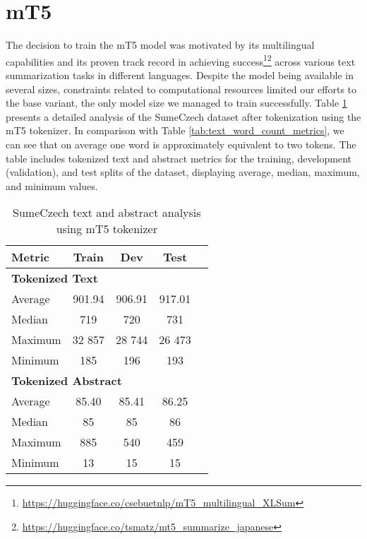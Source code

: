 \documentclass[english, ba, kiv, he, iso690numb, pdf, viewonly]{fasthesis}
\begin{document}
\section{mT5} \label{impl:mt5}
The decision to train the mT5 model was motivated by its multilingual capabilities and its proven track record in achieving success\footnote{\url{https://huggingface.co/csebuetnlp/mT5_multilingual_XLSum}}\footnote{\url{https://huggingface.co/tsmatz/mt5_summarize_japanese}} across various text summarization tasks in different languages. Despite the model being available in several sizes, constraints related to computational resources limited our efforts to the base variant, the only model size we managed to train successfully. Table \ref{tab:tokenized_text_abstract_metrics} presents a detailed analysis of the SumeCzech dataset after tokenization using the mT5 tokenizer. In comparison with Table \ref{tab:text_word_count_metrics}, we can see that on average one word is approximately equivalent to two tokens. The table includes tokenized text and abstract metrics for the training, development (validation), and test splits of the dataset, displaying average, median, maximum, and minimum values.

\begin{table}[htbp]
    \centering
    \caption{SumeCzech text and abstract analysis using mT5 tokenizer}
    \label{tab:tokenized_text_abstract_metrics}
    \begin{tabular}{lcccc}
        \toprule
        \textbf{Metric} & {\textbf{Train}} & {\textbf{Dev}} & {\textbf{Test}} \\
        \midrule
        \multicolumn{4}{l}{\textbf{Tokenized Text}} \\
        \midrule
        Average & 901.94 & 906.91 & 917.01 \\
        Median & 719 & 720 & 731 \\
        Maximum & 32 857 & 28 744 & 26 473 \\
        Minimum & 185 & 196 & 193 \\
        \midrule
        \multicolumn{4}{l}{\textbf{Tokenized Abstract}} \\
        \midrule
        Average & 85.40 & 85.41 & 86.25 \\
        Median & 85 & 85 & 86 \\
        Maximum & 885 & 540 & 459 \\
        Minimum & 13 & 15 & 15 \\
        \bottomrule
    \end{tabular}
\end{table}
\end{document}
